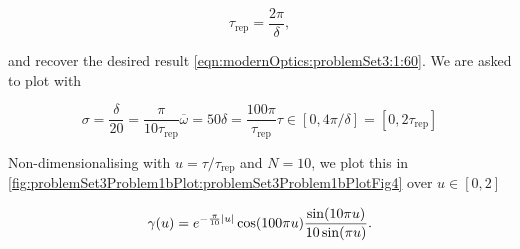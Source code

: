 {\begin{dmath}\label{eqn:modernOptics:problemSet3:1:620}
\tau_{\mathrm{rep}} = \frac{2 \pi}{\delta},
\end{dmath}

and recover the desired result \ref{eqn:modernOptics:problemSet3:1:60}.  We are asked to plot with

\begin{subequations}
\begin{equation}\label{eqn:modernOptics:problemSet3:1:640}
\sigma = \frac{\delta}{20} = \frac{\pi}{10 \tau_{\mathrm{rep}}}
\end{equation}
\begin{equation}\label{eqn:modernOptics:problemSet3:1:660}
\overbar{\omega} = 50 \delta = \frac{100 \pi}{\tau_{\mathrm{rep}}}
\end{equation}
\begin{equation}\label{eqn:modernOptics:problemSet3:1:680}
\tau \in [0, 4 \pi/\delta] = [0, 2 \tau_{\mathrm{rep}}]
\end{equation}
\end{subequations}

Non-dimensionalising with $u = \tau/\tau_{\mathrm{rep}}$ and $N = 10$, we plot this in \cref{fig:problemSet3Problem1bPlot:problemSet3Problem1bPlotFig4} over $u \in [0, 2]$

\begin{dmath}\label{eqn:modernOptics:problemSet3:1:700}
\gamma(u)
=
e^{ -\frac{\pi}{10} \Abs{u} }
\cos( 100 \pi u )
\frac{
\sin( 10 \pi u )
}
{
10 \sin( \pi u )
}.
\end{dmath}

}
